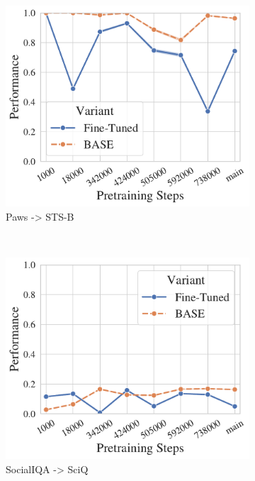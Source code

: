 \begin{figure}[t!]
    ~ 
    \begin{subfigure}[b]{0.25\textwidth}
    \includegraphics[width=\the\columnwidth]{figures/fig_files/ood/sft_evalstsb-trainpaws.pdf}
        \caption{Paws -> STS-B}
    \end{subfigure}%
    ~ 
    \begin{subfigure}[b]{0.25\textwidth}
    \includegraphics[width=\the\columnwidth]{figures/fig_files/ood/sft_evalsciq-trainsocialiqa.pdf}
        \caption{SocialIQA -> SciQ}
    \end{subfigure}%
    \begin{subfigure}[b]{0.25\textwidth}

\end{subfigure}
\end{figure}
